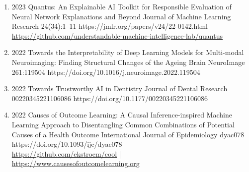 {\begin{enumerate}
    \item {}
                        {2023}
                        {Quantus: An Explainable AI Toolkit for Responsible Evaluation of Neural Network Explanations and Beyond}
                        {Journal of Machine Learning Research}
                        {24(34):1--11}
                        {https://jmlr.org/papers/v24/22-0142.html}
                        {\\\href{https://github.com/understandable-machine-intelligence-lab/quantus}{https://github.com/understandable-machine-intelligence-lab/quantus}}

    \item {}
                        {2022}
                        {Towards the Interpretability of Deep Learning Models for Multi-modal Neuroimaging: Finding Structural Changes of the Ageing Brain}
                        {NeuroImage}
                        {261:119504}
                        {https://doi.org/10.1016/j.neuroimage.2022.119504}


    \item {}
                        {2022}
                        {Towards Trustworthy AI in Dentistry}
                        {Journal of Dental Research}
                        {00220345221106086}
                        {https://doi.org/10.1177/00220345221106086}


    \item {}
                        {2022}
                        {Causes of Outcome Learning: A Causal Inference-inspired Machine Learning Approach to Disentangling Common Combinations of Potential Causes of a Health Outcome}
                        {International Journal of Epidemiology}
                        {dyac078}
                        {https://doi.org/10.1093/ije/dyac078}
                        {\\\href{https://github.com/ekstroem/cool}{https://github.com/ekstroem/cool} | 
                         \href{https://www.causesofoutcomelearning.org}{https://www.causesofoutcomelearning.org}
                        }


\end{enumerate}}
